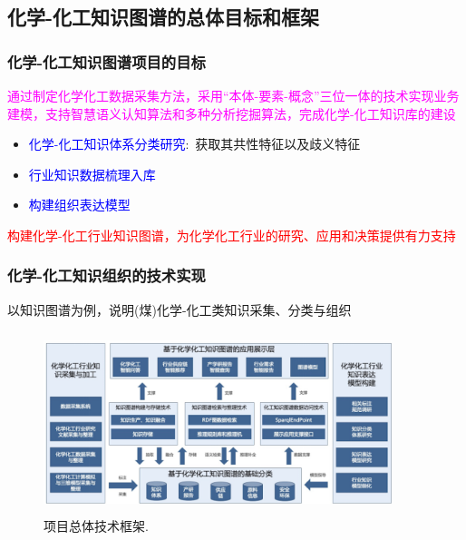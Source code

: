 \subsection{化学-化工知识图谱的总体目标和框架}
\frame
{
	\frametitle{化学-化工知识图谱项目的目标}
	\textcolor{magenta}{通过制定化学化工数据采集方法，采用``本体-要素-概念''三位一体的技术实现业务建模，支持智慧语义认知算法和多种分析挖掘算法，完成化学-化工知识库的建设} 
\begin{itemize}
	\item \textcolor{blue}{化学-化工知识体系分类研究}:~获取其共性特征以及歧义特征\\
		{\fontsize{7.2pt}{5.2pt}\selectfont{采用标签化、智能化建立知识库的方法，主要研究知识体系、产研报告、供应链信息、原料资料、安全质量、节能环保等细分语义分类，便于在知识图谱中进行建模训练}}

\item \textcolor{blue}{行业知识数据梳理入库}\\
	{\fontsize{7.2pt}{5.2pt}}

\item \textcolor{blue}{构建组织表达模型}\\
	{\fontsize{7.2pt}{5.2pt}\selectfont{采用数据提取、数据整合、知识融合、知识推理、质量评估、知识存储、图谱应用等建模流程节点方案，建立一套完善、可靠的化工化学全业务知识图谱系统方案}}
\end{itemize}
\textcolor{red}{构建化学-化工行业知识图谱，为化学化工行业的研究、应用和决策提供有力支持}
}
\begin{frame}
	\frametitle{化学-化工知识组织的技术实现}
	以知识图谱为例，说明(煤)化学-化工类知识采集、分类与组织
\begin{figure}[h!]
\centering
\includegraphics[height=2.08in,width=4.00in,viewport=0 0 245 113,clip]{Figures/KG_Chem-Frame.png}
\caption{\tiny 项目总体技术框架.}%
\label{KG_Chem-Frame}
\end{figure}
\end{frame}

